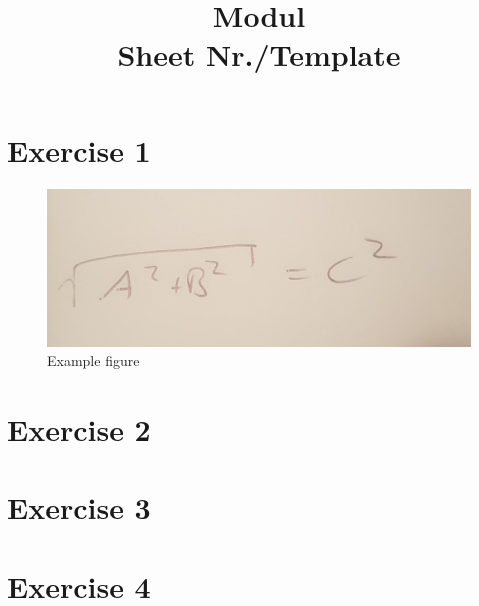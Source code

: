 \documentclass[bibliography=totocnumbered]{scrartcl}
\title{Modul\\Sheet \ac{Nr.}/Template}
\begin{document}
    \maketitle
    \tableofcontents
    \listoffigures
    
    
    \newpage
    \section{Exercise 1}
        \begin{figure}[H]
            \centering
            \includegraphics[width=\linewidth]{figures/template/example.jpeg}
            \caption{Example figure}
            \label{fig: Example}
        \end{figure}
    \newpage
    \section{Exercise 2}

    \newpage
    \section{Exercise 3}

    \newpage
    \section{Exercise 4}

    \newpage
    \appendix
    \printbibliography[title={Sources}]
\end{document}
